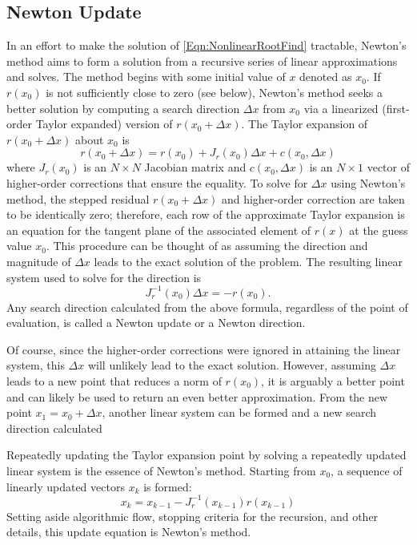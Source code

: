 \documentclass[Prelim,12pt]{WisconsinThesis}
\newcommand{\by}    {\!\times\!}
\begin{document}
\subsection{Newton Update}
In an effort to make the solution of \cref{Eqn:NonlinearRootFind} tractable, Newton's method aims to form a solution from a recursive series of linear approximations and solves.
The method begins with some initial value of $x$ denoted as $x_0$.
If $r(x_0)$ is not sufficiently close to zero (see below), Newton's method seeks a better solution by computing a search direction $\Delta{x}$ from $x_0$ via a linearized (first-order Taylor expanded) version of $r(x_0 + \Delta{x})$.
The Taylor expansion of $r(x_0 + \Delta{x})$ about $x_0$ is
\begin{equation}
    r(x_0 + \Delta{x}) =  r(x_0) + J_r(x_0)\Delta{x} + c(x_0,\Delta{x})
\end{equation}
where $J_r(x_0)$ is an $N \by N$ Jacobian matrix and $c(x_0,\Delta{x})$ is an $N \by 1$ vector of higher-order corrections that ensure the equality.
To solve for $\Delta{x}$ using Newton's method, the stepped residual $r(x_0 + \Delta{x})$ and higher-order correction are taken to be identically zero; therefore, each row of the approximate Taylor expansion is an equation for the tangent plane of the associated element of $r(x)$ at the guess value $x_0$.
This procedure can be thought of as assuming the direction and magnitude of $\Delta{x}$ leads to the exact solution of the problem.
The resulting linear system used to solve for the direction is
\begin{equation}
    J_{r}^{-1}(x_0) \Delta{x} = -r(x_0).
\end{equation}
Any search direction calculated from the above formula, regardless of the point of evaluation, is called a Newton update or a Newton direction.

Of course, since the higher-order corrections were ignored in attaining the linear system, this $\Delta{x}$ will unlikely lead to the exact solution.
However, assuming $\Delta{x}$ leads to a new point that reduces a norm of $r(x_0)$, it is arguably a better point and can likely be used to return an even better approximation.
From the new point $x_1 = x_0 + \Delta{x}$, another linear system can be formed and a new search direction calculated

Repeatedly updating the Taylor expansion point by solving a repeatedly updated linear system is the essence of Newton's method.
Starting from $x_0$, a sequence of linearly updated vectors $x_k$ is formed:
\begin{equation}
    x_k = x_{k-1} - J_r^{-1}(x_{k-1}) r(x_{k-1})
\end{equation}
Setting aside algorithmic flow, stopping criteria for the recursion, and other details, this update equation is Newton's method.
%
%
%
%
%
%
%
%
%
%
%
%
%
%
%
%
%
%
%
%
%
%
\end{document}
